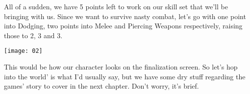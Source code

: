 All of a sudden, we have 5 points left to work on our skill set that we'll be bringing with us. Since we want to survive nasty combat, let's go with one point into Dodging, two points into Melee and Piercing Weapons respectively, raising those to 2, 3 and 3.

\texttt{[image: 02]}

This would be how our character looks on the finalization screen. So let's hop into the world' is what I'd usually say, but we have some dry stuff regarding the games' story to cover in the next chapter. Don't worry, it's brief.